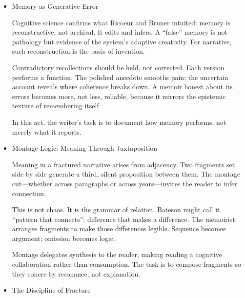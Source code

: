 \documentclass[11pt]{article}
\begin{document}
\begin{itemize}
Fracture extends from time to perception. Mieke Bal distinguished among “who sees,” “who speaks,” and “who knows.” When these positions diverge, perspective multiplies.

The memoirist operates across two axes: the experiencing self and the narrating self. The former inhabits events; the latter frames them. Their dialogue—sometimes cooperative, sometimes adversarial—creates the tension that powers the genre. A shift in focalization alters moral gravity: the scene seen through another’s eyes redistributes sympathy and blame.

To frame is to decide where consciousness begins and ends. A tight interior frame invites empathy; an exterior one restores context; alternation between them produces insight that neither alone could yield.
\item Memory as Generative Error
\label{sec:org8983da6}

Cognitive science confirms what Ricoeur and Bruner intuited: memory is reconstructive, not archival. It edits and infers. A “false” memory is not pathology but evidence of the system’s adaptive creativity. For narrative, such reconstruction is the basis of invention.

Contradictory recollections should be held, not corrected. Each version performs a function. The polished anecdote smooths pain; the uncertain account reveals where coherence breaks down. A memoir honest about its errors becomes more, not less, reliable, because it mirrors the epistemic texture of remembering itself.

In this act, the writer’s task is to document how memory performs, not merely what it reports.
\item Montage Logic: Meaning Through Juxtaposition
\label{sec:orgdf49a26}

Meaning in a fractured narrative arises from adjacency. Two fragments set side by side generate a third, silent proposition between them. The montage cut—whether across paragraphs or across years—invites the reader to infer connection.

This is not chaos. It is the grammar of relation. Bateson might call it “pattern that connects”: difference that makes a difference. The memoirist arranges fragments to make those differences legible. Sequence becomes argument; omission becomes logic.

Montage delegates synthesis to the reader, making reading a cognitive collaboration rather than consumption. The task is to compose fragments so they cohere by resonance, not explanation.
\item The Discipline of Fracture
\label{sec:org7666a6f}


\end{itemize}
\end{document}
